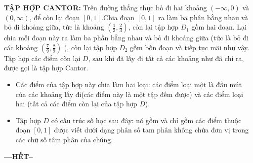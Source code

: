 \documentclass[12pt,a4paper]{article}
\begin{document}
\pagebreak
\hspace{0.1cm}\textbf{TẬP HỢP CANTOR:} Trên đường thẳng thực bỏ đi hai khoảng $(-\infty, 0)$ và $(0, \infty)$, để còn lại đoạn $[0,1]$.Chia đoạn $[0,1]$ ra làm ba phân bằng nhau và bỏ đi khoảng giữa, tức là khoảng $(\frac{1}{3}, \frac{2}{3})$, còn lại tập hợp $D_1$ gồm hai đoạn. Lại chia mỗi đoạn này ra làm ba phần bằng nhau và bỏ đi khoảng giữa (tức là bỏ đi các khoảng $(\frac{7}{9}, \frac{8}{9})$ ), còn lại tập hợp $D_2$ gồm bốn đoạn và tiếp tục mãi như vậy. Tập hợp các điểm còn lại $D$, sau khi đã lấy đi tất cả các khoảng như đã chỉ ra, được gọi là {\color{red}tập hợp Cantor}.\\
\begin{itemize}
\item Các điểm của tập hợp này chia làm hai loại: các điểm loại một là đầu mút của các khoảng lấy đi(các điểm này là một tập đếm được) và các điểm loại hai (tất cả các điểm còn lại của tập hợp $D$).\\
\item Tập hợp $D$ có cấu trúc số học sau đây: nó gồm và chỉ gồm các điểm thuộc đoạn $[0,1]$ được viết dưới dạng phân số tam phân không chứa đơn vị trong các chữ số tâm phân của chúng.\\
\end{itemize}
\begin{center}
\bfseries 
{---HẾT--}
\end{center}
\end{document}
